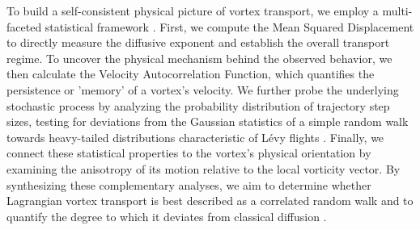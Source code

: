 \documentclass[]{article}
\begin{document}
To build a self-consistent physical picture of vortex transport, we employ a multi-faceted statistical framework \citep{kumar2025trappingtransportinertialparticles,aulnette2025transportsphericalmicroparticles3d}. First, we compute the Mean Squared Displacement to directly measure the diffusive exponent and establish the overall transport regime. To uncover the physical mechanism behind the observed behavior, we then calculate the Velocity Autocorrelation Function, which quantifies the persistence or 'memory' of a vortex's velocity. We further probe the underlying stochastic process by analyzing the probability distribution of trajectory step sizes, testing for deviations from the Gaussian statistics of a simple random walk towards heavy-tailed distributions characteristic of Lévy flights \citep{kumar2025trappingtransportinertialparticles}. Finally, we connect these statistical properties to the vortex's physical orientation by examining the anisotropy of its motion relative to the local vorticity vector. By synthesizing these complementary analyses, we aim to determine whether Lagrangian vortex transport is best described as a correlated random walk and to quantify the degree to which it deviates from classical diffusion \citep{kumar2025trappingtransportinertialparticles,aulnette2025transportsphericalmicroparticles3d}.
\end{document}

